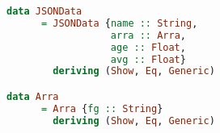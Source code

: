 \begin{lstlisting}[language=Haskell]
data JSONData
      = JSONData {name :: String,
                  arra :: Arra,
                  age :: Float,
                  avg :: Float}
        deriving (Show, Eq, Generic)

data Arra
      = Arra {fg :: String}
        deriving (Show, Eq, Generic)            
\end{lstlisting}




\printbibliography[%
    heading=bibintoc%
]


